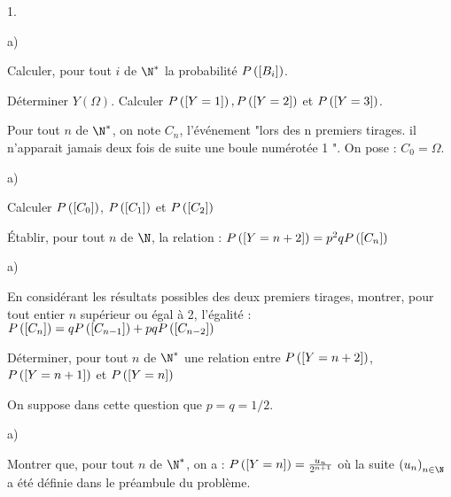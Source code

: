 \documentclass[11pt]{article}%
\begin{document}
\begin{noliste}{1.}
 \setlength{\itemsep}{4mm}
\item 

\begin{noliste}{a)}
 \setlength{\itemsep}{2mm}
\item Calculer, pour tout $i$ de $\N^{\ast}$ la probabilité
$P\left(\left[ { B_{i}} \right]\right) $.

\item Déterminer $Y\left( \Omega \right) $. Calculer $P\left(\left[ { Y =
1} \right]\right),P\left(\left[ { Y = 2} \right]\right) $ et $P\left(\left[ { Y = 3} \right]\right) $.
\end{noliste}

\item Pour tout $n$ de $\N^{\ast}$, on note $C_{n}$, l'événement "lors
des n premiers tirages. il n'apparait jamais deux fois de suite
une boule numérotée 1 ". On pose : $C_{0} = \Omega$.

\begin{noliste}{a)}
 \setlength{\itemsep}{2mm}
\item Calculer $P\left(\left[ { C_{0}} \right]\right) $, $P\left(\left[ { C_{1}} \right]\right)
$ et $P\left(\left[ {
C_{2}} \right]\right) $

\item Établir, pour tout $n$ de $\N$, la relation : $P\left(\left[ { Y = n
+ 2} \right]\right) = p^{2}qP\left(\left[ { C_{n}} \right]\right) $
\end{noliste}

\item 

\begin{noliste}{a)}
 \setlength{\itemsep}{2mm}
\item En considérant les résultats possibles des deux premiers
tirages, montrer, pour tout entier $n$ supérieur ou égal à 2, l'égalité
: $P\left(\left[ { C_{n}} \right]\right) = qP\left(\left[ { C_{n-1}} \right]\right) +
pqP\left(\left[ {
C_{n-2}} \right]\right) $

\item Déterminer, pour tout $n$ de $\N^{\ast}$ une relation
entre $P\left(\left[ { Y = n + 2} \right]\right) $, $P\left(\left[ { Y = n + 1
} \right]\right) $ et $P\left(\left[ { Y = n} \right]\right) $
\end{noliste}

\item On suppose dans cette question que $p = q = 1/2$.

\begin{noliste}{a)}
 \setlength{\itemsep}{2mm}
\item Montrer que, pour tout $n$ de $\N^{\ast}$, on a : $P\left(\left[ { Y
= n} \right]\right) = \frac{u_{n}}{2^{n + 1}}$ où la suite $\left(
u_{n}\right)_{n\in \N}$ a été définie dans le préambule du problème.


\end{noliste}
\end{noliste}
\end{document}
